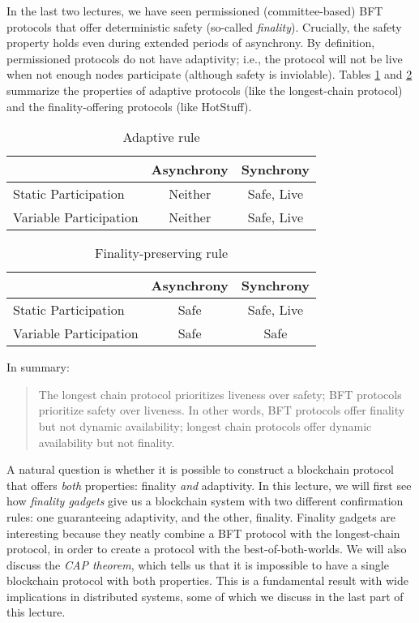 \documentclass{article}
\begin{document}
In the last two lectures, we have seen permissioned (committee-based) BFT protocols that offer deterministic safety (so-called {\em finality}). Crucially, the safety property holds even during extended periods of asynchrony. By definition, permissioned protocols do not have adaptivity;  i.e., the protocol will not be live when not enough nodes participate (although safety is inviolable).  Tables \ref{tab:CAP_properties_adaptive} and \ref{tab:CAP_properties_final} summarize the properties of adaptive protocols (like the longest-chain protocol) and the finality-offering protocols (like HotStuff).
\begin{table}[htbp]
\centering
\caption{Adaptive rule}
\label{tab:CAP_properties_adaptive}
\begin{tabular}{|l|c|c|}
\hline & Asynchrony & Synchrony \\ \hline
Static Participation & Neither & Safe, Live \\ \hline
Variable Participation & Neither & Safe, Live \\ \hline
\end{tabular}
\end{table}
\begin{table}[htbp]
\centering
\caption{Finality-preserving rule}
\label{tab:CAP_properties_final}
\begin{tabular}{|l|c|c|}
\hline & Asynchrony & Synchrony \\ \hline
Static Participation & Safe & Safe, Live \\ \hline
Variable Participation & Safe & Safe \\ \hline
\end{tabular}
\end{table}

In summary:
\begin{quote}
    The longest chain protocol prioritizes liveness over safety; BFT protocols prioritize safety over liveness. In other words, BFT protocols offer finality but not dynamic availability; longest chain protocols offer dynamic availability but not finality. 
\end{quote}
A natural question is whether it is possible to construct a blockchain protocol that offers {\em both} properties: finality {\em and} adaptivity. In this lecture, we will first see how \textit{finality gadgets} give us a blockchain system with two different confirmation rules: one guaranteeing adaptivity, and the other, finality. Finality gadgets are interesting because they neatly combine a BFT protocol with the longest-chain protocol, in order to create a protocol with the best-of-both-worlds. We will also discuss the \textit{CAP theorem}, which tells us that it is impossible to have a single blockchain protocol with both properties. This is a fundamental result with wide implications in distributed systems, some of which we discuss in the last part of this lecture.
\end{document}
